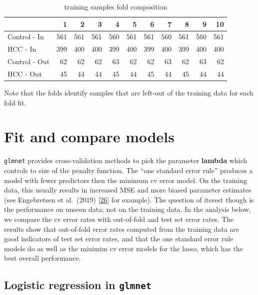 \documentclass[
]{book}
\begin{document}
\begin{table}

\caption{\label{tab:getTrainFolds}training samples fold composition}
\centering
\begin{tabular}[t]{l|r|r|r|r|r|r|r|r|r|r}
\hline
  & 1 & 2 & 3 & 4 & 5 & 6 & 7 & 8 & 9 & 10\\
\hline
Control - In & 561 & 561 & 561 & 560 & 561 & 561 & 560 & 561 & 560 & 561\\
\hline
HCC - In & 399 & 400 & 400 & 399 & 400 & 399 & 400 & 399 & 400 & 400\\
\hline
Control - Out & 62 & 62 & 62 & 63 & 62 & 62 & 63 & 62 & 63 & 62\\
\hline
HCC - Out & 45 & 44 & 44 & 45 & 44 & 45 & 44 & 45 & 44 & 44\\
\hline
\end{tabular}
\end{table}

Note that the folds identify samples that are left-out of the training
data for each fold fit.

\hypertarget{fit-and-compare-models}{%
\section{Fit and compare models}\label{fit-and-compare-models}}

\texttt{glmnet} provides cross-validation methods to pick the parameter \textbf{lambda} which
controls to size of the penalty function. The ``one standard error rule''
produces a model with fewer predictors then the minimum cv error model.
On the training data, this usually results in increased MSE and more
biased parameter estimates
(see Engebretsen et al.~(2019) {[}\protect\hyperlink{ref-Engebretsen:2019aa}{26}{]} for example).
The question of iterest though is the performance on unseen data; not on the training data.
In the analysis below, we compare the cv error rates with out-of-fold and
test set error rates. The results show that out-of-fold error rates computed from
the training data are good indicators of test set error rates, and that
the one standard error rule models do as well as the minimim cv error models
for the lasso, which has the best overall performance.

\hypertarget{logistic-regression-in-glmnet}{%
\subsection{\texorpdfstring{Logistic regression in \texttt{glmnet}}{Logistic regression in glmnet}}\label{logistic-regression-in-glmnet}}
\end{document}
